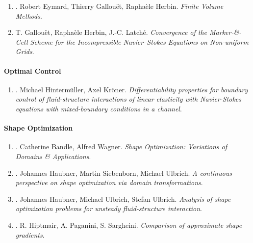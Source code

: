 \documentclass{article}
\begin{document}
\begin{enumerate}
	\item \cite{Eymard_Gallouet_Herbin2019}. Robert Eymard, Thierry Gallou\"et, Rapha\`ele Herbin. {\it Finite Volume Methods}.\hfill{\sf[reading]}
	
	\item T. Gallou\"et, Rapha\`ele Herbin, J.-C. Latch\'e. {\it Convergence of the Marker-\&-Cell Scheme for the Incompressible Navier--Stokes Equations on Non-uniform Grids}.\hfill{\sf[reading]}
\end{enumerate}

\paragraph{Optimal Control}

\begin{enumerate}
	\item \cite{Hintermueller_Kroener2023}. Michael Hinterm\"uller, Axel Kr\"oner. {\it Differentiability properties for boundary control of fluid-structure interactions of linear elasticity with Navier-Stokes equations with mixed-boundary conditions in a channel}.\hfill{\sf[done]}
\end{enumerate}

\paragraph{Shape Optimization}

\begin{enumerate}
	\item \cite{Bandle_Wagner2023}. Catherine Bandle, Alfred Wagner. {\it Shape Optimization: Variations of Domains \& Applications}.\hfill{\sf[reading]}
	
	\item \cite{Haubner_Siebenborn_Ulbrich2021}. Johannes Haubner, Martin Siebenborn, Michael Ulbrich. {\it A continuous perspective on shape optimization via domain transformations}.\hfill{\sf[done]}
	
	\item \cite{Haubner_Ulbrich_Ulbrich2020}. Johannes Haubner, Michael Ulbrich, Stefan Ulbrich. {\it Analysis of shape optimization problems for unsteady fluid-structure interaction}.\hfill{\sf[done]}
	
	\item \cite{Hiptmair_Paganini_Sargheini2015}. R. Hiptmair, A. Paganini, S. Sargheini. {\it Comparison of approximate shape gradients}.\hfill{\sf[done]}
\end{enumerate}
\end{document}
